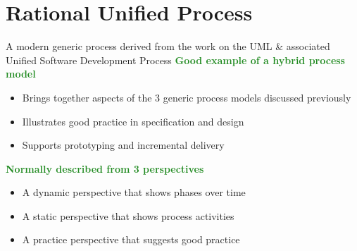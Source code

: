 \documentclass{report}
\newcommand{\textg}[1]{\textcolor{ForestGreen}{#1}}
\newcommand{\textbfg}[1]{\textbf{\textg{#1}}}
\begin{document}
\section{Rational Unified Process}
\noindent A modern generic process derived from the work on the UML \& associated Unified Software Development Process \newline
\textbfg{Good example of a hybrid process model}
\begin{itemize}
  \item Brings together aspects of the 3 generic process models discussed previously
  \item Illustrates good practice in specification and design
  \item Supports prototyping and incremental delivery
\end{itemize}
\textbfg{Normally described from 3 perspectives}
\begin{itemize}
  \item A dynamic perspective that shows phases over time
  \item A static perspective that shows process activities
  \item A practice perspective that suggests good practice
\end{itemize}

\newpage
\end{document}
